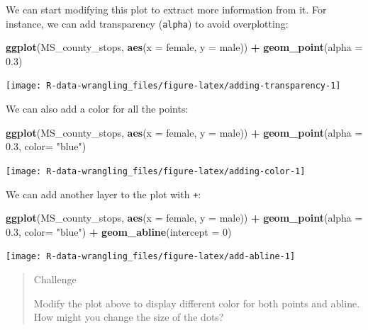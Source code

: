 \documentclass[]{book}
\newenvironment{Shaded}{\begin{snugshade}}{\end{snugshade}}
\newcommand{\DataTypeTok}[1]{\textcolor[rgb]{0.13,0.29,0.53}{#1}}
\newcommand{\DecValTok}[1]{\textcolor[rgb]{0.00,0.00,0.81}{#1}}
\newcommand{\FloatTok}[1]{\textcolor[rgb]{0.00,0.00,0.81}{#1}}
\newcommand{\KeywordTok}[1]{\textcolor[rgb]{0.13,0.29,0.53}{\textbf{#1}}}
\newcommand{\NormalTok}[1]{#1}
\newcommand{\OperatorTok}[1]{\textcolor[rgb]{0.81,0.36,0.00}{\textbf{#1}}}
\newcommand{\StringTok}[1]{\textcolor[rgb]{0.31,0.60,0.02}{#1}}
\begin{document}
We can start modifying this plot to extract more information from it. For instance, we can add transparency (\texttt{alpha}) to avoid overplotting:

\begin{Shaded}
\begin{Highlighting}[]
  \KeywordTok{ggplot}\NormalTok{(MS_county_stops, }\KeywordTok{aes}\NormalTok{(}\DataTypeTok{x =}\NormalTok{ female, }\DataTypeTok{y =}\NormalTok{ male)) }\OperatorTok{+}\StringTok{ }
\StringTok{  }\KeywordTok{geom_point}\NormalTok{(}\DataTypeTok{alpha =} \FloatTok{0.3}\NormalTok{)}
\end{Highlighting}
\end{Shaded}

\texttt{[image: R-data-wrangling\_files/figure-latex/adding-transparency-1]}

We can also add a color for all the points:

\begin{Shaded}
\begin{Highlighting}[]
\KeywordTok{ggplot}\NormalTok{(MS_county_stops, }\KeywordTok{aes}\NormalTok{(}\DataTypeTok{x =}\NormalTok{ female, }\DataTypeTok{y =}\NormalTok{ male)) }\OperatorTok{+}\StringTok{ }
\StringTok{  }\KeywordTok{geom_point}\NormalTok{(}\DataTypeTok{alpha =} \FloatTok{0.3}\NormalTok{, }\DataTypeTok{color=} \StringTok{"blue"}\NormalTok{)}
\end{Highlighting}
\end{Shaded}

\texttt{[image: R-data-wrangling\_files/figure-latex/adding-color-1]}

We can add another layer to the plot with \texttt{+}:

\begin{Shaded}
\begin{Highlighting}[]
\KeywordTok{ggplot}\NormalTok{(MS_county_stops, }\KeywordTok{aes}\NormalTok{(}\DataTypeTok{x =}\NormalTok{ female, }\DataTypeTok{y =}\NormalTok{ male)) }\OperatorTok{+}\StringTok{ }
\StringTok{  }\KeywordTok{geom_point}\NormalTok{(}\DataTypeTok{alpha =} \FloatTok{0.3}\NormalTok{, }\DataTypeTok{color=} \StringTok{"blue"}\NormalTok{) }\OperatorTok{+}
\StringTok{  }\KeywordTok{geom_abline}\NormalTok{(}\DataTypeTok{intercept =} \DecValTok{0}\NormalTok{)}
\end{Highlighting}
\end{Shaded}

\texttt{[image: R-data-wrangling\_files/figure-latex/add-abline-1]}

\begin{quote}
Challenge

Modify the plot above to display different color for both points and abline. How might you change the size of the dots?
\end{quote}
\end{document}

